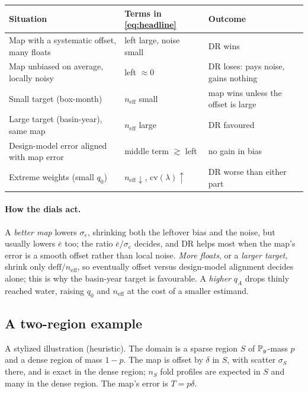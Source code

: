 \begin{center}\small
\begin{tabular}{@{}p{5.6cm}p{4.0cm}p{4.4cm}@{}}
\toprule
Situation & Terms in \eqref{eq:headline} & Outcome\\
\midrule
Map with a systematic offset, many floats & left large, noise small & DR wins\\
Map unbiased on average, locally noisy & left $\approx0$ & DR loses: pays noise, gains nothing\\
Small target (box-month) & $n_{\mathrm{eff}}$ small & map wins unless the offset is large\\
Large target (basin-year), same map & $n_{\mathrm{eff}}$ large & DR favoured\\
Design-model error aligned with map error & middle term $\gtrsim$ left & no gain in bias\\
Extreme weights (small $q_0$) & $n_{\mathrm{eff}}\downarrow$, $\mathrm{cv}(\lambda)\uparrow$ & DR worse than either part \citep{kang2007}\\
\bottomrule
\end{tabular}
\end{center}

\paragraph{How the dials act.} A \emph{better map} lowers $\sigma_e$, shrinking both the leftover bias and
the noise, but usually lowers $\bar e$ too; the ratio $\bar e/\sigma_e$ decides, and DR helps most when
the map's error is a smooth offset rather than local noise. \emph{More floats}, or a \emph{larger
target}, shrink only $\mathrm{deff}/n_{\mathrm{eff}}$, so eventually offset versus design-model
alignment decides alone; this is why the basin-year target is favourable. A \emph{higher} $q_A$ drops thinly reached water,
raising $q_0$ and $n_{\mathrm{eff}}$ at the cost of a smaller estimand.

\subsection{A two-region example}\label{sec:two-region}

A stylized illustration (heuristic). The domain is a sparse region $S$ of
$\mathbb{P}_y$-mass $p$ and a dense region of mass $1-p$. The map is offset by $\delta$ in $S$, with scatter
$\sigma_S$ there, and is exact in the dense region; $n_S$ fold profiles are expected in $S$ and many in
the dense region. The map's error is $T=p\delta$.

